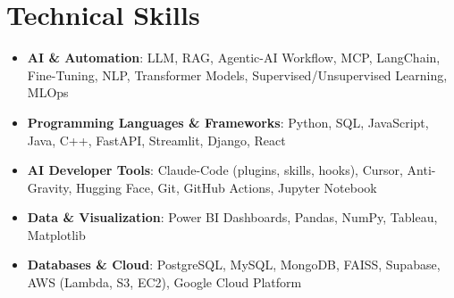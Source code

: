 \documentclass[letterpaper,11pt]{article}
\makeatletter
\newcommand{\resumeItem}[1]{\item\small{#1 \vspace{-4pt}}}
\newcommand{\resumeSubheading}[4]{
    \vspace{-2pt}\item
    \begin{tabular*}{1.0\textwidth}[t]{l@{\extracolsep{\fill}}r}
        \textbf{#1} & \textbf{\small #2} \\
        \textit{\small#3} & \textit{\small #4}
    \end{tabular*}\vspace{-7pt}
}
\newcommand{\resumeSubItem}[1]{\resumeItem{#1}\vspace{-4pt}}
\newcommand{\resumeSubHeadingListStart}{\begin{itemize}[leftmargin=0.0in, label={}]}
\newcommand{\resumeSubHeadingListEnd}{\end{itemize}}
\newcommand{\resumeItemListStart}{\begin{itemize}}
\newcommand{\resumeItemListEnd}{\end{itemize}\vspace{-7pt}}
\makeatother
\begin{document}




\vspace{-0.4cm}
\vspace{3pt}
\section{Technical Skills}
\resumeSubHeadingListStart
\resumeSubItem{\textbf{AI \& Automation}{: LLM, RAG, Agentic-AI Workflow, MCP, LangChain, Fine-Tuning, NLP, Transformer Models, Supervised/Unsupervised Learning, MLOps}}
\vspace{4pt}
\resumeSubItem{\textbf{Programming Languages \& Frameworks}{: Python, SQL, JavaScript, Java, C++, FastAPI, Streamlit, Django, React}}
\vspace{4pt}
\resumeSubItem{\textbf{AI Developer Tools}{: Claude-Code (plugins, skills, hooks), Cursor, Anti-Gravity, Hugging Face, Git, GitHub Actions, Jupyter Notebook}}
\vspace{4pt}
\resumeSubItem{\textbf{Data \& Visualization}{: Power BI Dashboards, Pandas, NumPy, Tableau, Matplotlib}}
\vspace{4pt}
\resumeSubItem{\textbf{Databases \& Cloud}{: PostgreSQL, MySQL, MongoDB, FAISS, Supabase, AWS (Lambda, S3, EC2), Google Cloud Platform}}
\resumeSubHeadingListEnd
\end{document}
